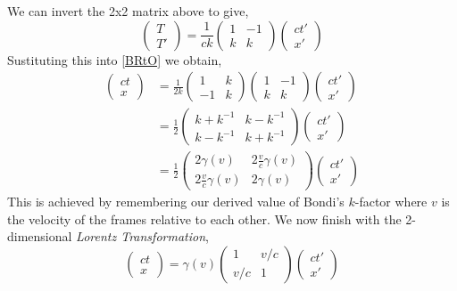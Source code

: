 \documentclass[a4paper,12pt,draft]{report}
\begin{document}
We can invert the 2x2 matrix above to give,
$$
\begin{pmatrix}T\\T'\end{pmatrix} = \frac{1}{ck}
\begin{pmatrix}
1 & -1\\
k & k
\end{pmatrix}
\begin{pmatrix}ct'\\x'\end{pmatrix}
$$
Sustituting this into \eqref{BRtO} we obtain,
$$
\begin{aligned}
\begin{pmatrix}ct\\x\end{pmatrix} & = \frac{1}{2k}
\begin{pmatrix}
1 & k\\
-1 & k
\end{pmatrix}
\begin{pmatrix}
1 & -1\\
k & k
\end{pmatrix}
\begin{pmatrix}ct'\\x'\end{pmatrix}\\
& = \frac{1}{2}
\begin{pmatrix}
k + k^{-1} & k - k^{-1}\\
k - k^{-1} & k + k^{-1}
\end{pmatrix}
\begin{pmatrix}ct'\\x'\end{pmatrix}\\
& = \frac{1}{2}
\begin{pmatrix}
2\gamma(v) & 2\frac{v}{c}\gamma(v)\\
2\frac{v}{c}\gamma(v) & 2\gamma(v)
\end{pmatrix}
\begin{pmatrix}ct'\\x'\end{pmatrix}
\end{aligned}
$$
This is achieved by remembering our derived value of Bondi's $k$-factor where $v$ is the velocity of the frames relative to each other. We now finish with the 2-dimensional \emph{Lorentz Transformation},
$$
\begin{pmatrix}ct\\x\end{pmatrix} = \gamma(v)
\begin{pmatrix}
1 & v/c\\
v/c & 1
\end{pmatrix}
\begin{pmatrix}ct'\\x'\end{pmatrix}
$$
\end{document}
